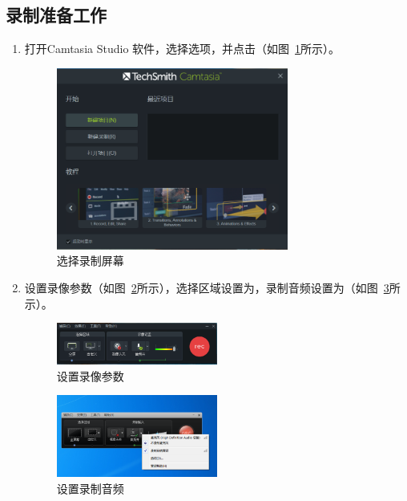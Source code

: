 \documentclass[12pt]{ctexart}
\begin{document}
\subsection{录制准备工作}
\begin{enumerate}
\item 打开Camtasia Studio 软件，选择{\color{blue}{新建项目}}选项，并点击{\color{blue}{录制}}（如图~\ref{fig:1.PNG}所示）。
    \begin{figure}[!ht]
    \centering
    \includegraphics[width=3in]{1.PNG}
    \caption{选择录制屏幕}
    \label{fig:1.PNG}
    \end{figure}  
    
\item 设置录像参数（如图~\ref{fig:2.PNG}所示），选择区域设置为{\color{blue}{全屏}}，录制音频设置为（如图~\ref{fig:03.png}所示）。
    \begin{figure}[!ht]
    \centering
    \includegraphics[width=0.5\textwidth]{2.PNG}
    \caption{设置录像参数}
    \label{fig:2.PNG}
    \end{figure}  
    \begin{figure}[!ht]
    \centering
    \includegraphics[width=0.5\textwidth]{03.png}
    \caption{设置录制音频}
    \label{fig:03.png}
    \end{figure}
\end{enumerate}
\end{document}

